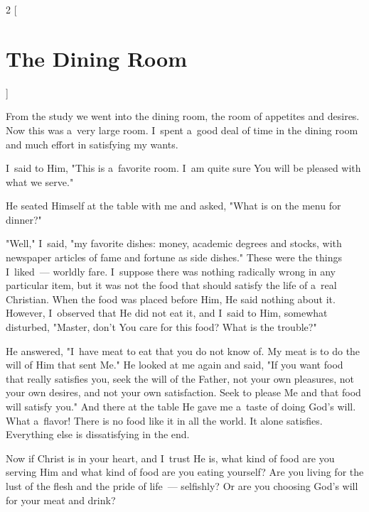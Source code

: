 \documentclass[a4paper,12pt]{article}
\begin{document}
\begin{multicols}{2}
    [
\section*{The Dining Room}
    ]

From the study we went into the dining room, the room of appetites and desires. Now this was a~very large room. I~spent a~good deal of time in the dining room and much effort in satisfying my wants. 

I~said to Him, "This is a~favorite room. I~am quite sure You will be pleased with what we serve." 

He seated Himself at the table with me and asked, "What is on the menu for dinner?" 

"Well," I~said, "my favorite dishes: money, academic degrees and stocks, with newspaper articles of fame and fortune as side dishes." These were the things I~liked~--- worldly fare. I~suppose there was nothing radically wrong in any particular item, but it was not the food that should satisfy the life of a~real Christian. When the food was placed before Him, He said nothing about it. However, I~observed that He did not eat it, and I~said to Him, somewhat disturbed, "Master, don't You care for this food? What is the trouble?" 

He answered, "I~have meat to eat that you do not know of. My meat is to do the will of Him that sent Me." He looked at me again and said, "If you want food that really satisfies you, seek the will of the Father, not your own pleasures, not your own desires, and not your own satisfaction. Seek to please Me and that food will satisfy you." And there at the table He gave me a~taste of doing God's will. What a~flavor! There is no food like it in all the world. It alone satisfies. Everything else is dissatisfying in the end. 

Now if Christ is in your heart, and I~trust He is, what kind of food are you serving Him and what kind of food are you eating yourself? Are you living for the lust of the flesh and the pride of life~--- selfishly? Or are you choosing God's will for your meat and drink? 
\end{multicols}
\end{document}
